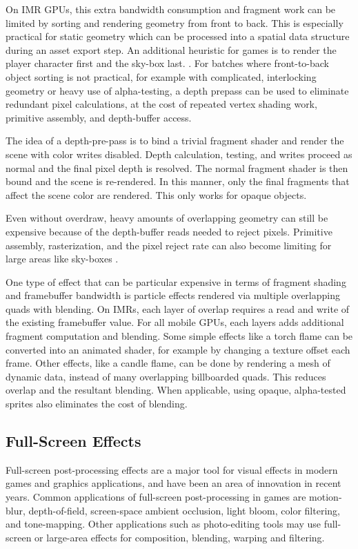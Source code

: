 On IMR GPUs, this extra bandwidth consumption and fragment work can be limited
by sorting and rendering geometry from front to back.  This is especially
practical for static geometry which can be processed into a spatial data
structure during an asset export step.  An additional heuristic for games is to
render the player character first and the sky-box last.
\cite{Pranckevicius11a}.  For batches where front-to-back object sorting is not
practical, for example with complicated, interlocking geometry or heavy use of
alpha-testing, a depth prepass can be used to eliminate redundant pixel
calculations, at the cost of repeated vertex shading work, primitive assembly,
and depth-buffer access.

The idea of a depth-pre-pass is to bind a trivial fragment shader and render
the scene with color writes disabled.  Depth calculation, testing, and writes
proceed as normal and the final pixel depth is resolved.  The normal
fragment shader is then bound and the scene is re-rendered.  In this manner,
only the final fragments that affect the scene color are rendered.  This only
works for opaque objects.

Even without overdraw, heavy amounts of overlapping geometry can still be
expensive because of the depth-buffer reads needed to reject pixels.  Primitive
assembly, rasterization, and the pixel reject rate can also become limiting for
large areas like sky-boxes \cite{Pranckevicius11a}.

One type of effect that can be particular expensive in terms of fragment
shading and framebuffer bandwidth is particle effects rendered via multiple
overlapping quads with blending.  On IMRs, each layer of overlap requires a
read and
 write of the existing framebuffer value.  For all mobile GPUs, each
layers adds additional fragment computation
 and blending.  Some simple
effects
 like a torch flame can be converted into an animated shader, for
example by
 changing a texture offset each frame.  Other effects, like a
candle flame, can
 be done by rendering a mesh of dynamic data, instead of
many overlapping billboarded quads.  This
 reduces overlap and the resultant
blending.  When applicable, using opaque, alpha-tested sprites also eliminates
the cost of blending.

\subsection {Full-Screen Effects}\label{Jon-McCaffrey-Full-Screen-Effects}
Full-screen post-processing effects are a major tool for visual effects in
modern games and graphics applications, and have been an area of innovation in
recent years.   Common applications of full-screen post-processing in games are
motion-blur, depth-of-field, screen-space ambient occlusion, light bloom, color
filtering, and tone-mapping.  Other applications such as photo-editing tools
may use full-screen or large-area effects for composition, blending, warping
and filtering.

